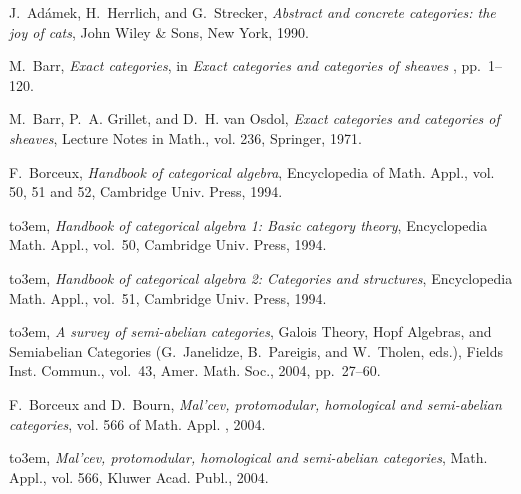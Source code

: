 \documentclass [12pt,oneside]{book}%
\theoremstyle{captionstyle}  %
\begin{document}
\chead{\fontsize{9}{10}\selectfont{\sffamily%
    }}
\rhead{\fontsize{9}{10}\selectfont{\sffamily%
    }}

\providecommand{\noopsort}[1]{}
\providecommand{\bysame}{\leavevmode\hbox to3em{\hrulefill}\thinspace}
\providecommand{\MR}{\relax\ifhmode\unskip\space\fi MR }
\providecommand{\MRhref}[2]{%
    \href{http://www.ams.org/mathscinet-getitem?mr=#1}{#2}
}
\providecommand{\href}[2]{#2}
\begin{thebibliography}{10}

    J.~Ad{\'a}mek, H.~Herrlich, and G.~Strecker, \emph{Abstract and concrete
        categories: the joy of cats}, John Wiley \& Sons, New York, 1990.

    M.~Barr, \emph{Exact categories}, in \emph{Exact categories and categories of
        sheaves} \cite{Barr-Grillet-vanOsdol}, pp.~1--120.

    M.~Barr, P.~A. Grillet, and D.~H. van Osdol, \emph{Exact categories and
        categories of sheaves}, Lecture Notes in Math., vol. 236, Springer, 1971.

    F.~Borceux, \emph{Handbook of categorical algebra}, Encyclopedia of Math.
    Appl., vol. 50, 51 and 52, Cambridge Univ. Press, 1994.

    \bysame, \emph{Handbook of categorical algebra 1: Basic category theory},
    Encyclopedia Math. Appl., vol.~50, Cambridge Univ. Press, 1994.

    \bysame, \emph{Handbook of categorical algebra 2: Categories and structures},
    Encyclopedia Math. Appl., vol.~51, Cambridge Univ. Press, 1994.

    \bysame, \emph{A survey of semi-abelian categories}, {G}alois Theory, {H}opf
    Algebras, and Semiabelian Categories (G.~Janelidze, B.~Pareigis, and
    W.~Tholen, eds.), Fields Inst. Commun., vol.~43, Amer. Math. Soc., 2004,
    pp.~27--60.

    F.~Borceux and D.~Bourn, \emph{Mal'cev, protomodular, homological and
        semi-abelian categories}, vol. 566 of Math. Appl. \cite{FBorceuxDBourn2004},
    2004.

    \bysame, \emph{Mal'cev, protomodular, homological and semi-abelian categories},
    Math. Appl., vol. 566, Kluwer Acad. Publ., 2004.


\end{thebibliography}
\end{document}
